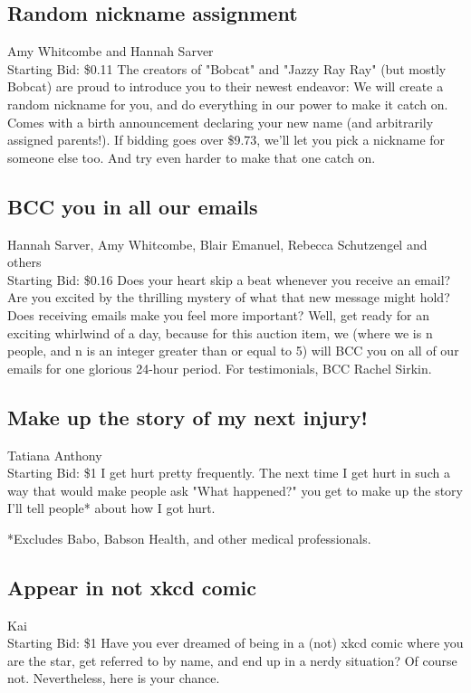 \documentclass[11pt]{article}
\begin{document}
\subsection{Random nickname assignment}
Amy Whitcombe and Hannah Sarver
\\
Starting Bid: \$0.11
\newline
The creators of "Bobcat" and "Jazzy Ray Ray" (but mostly Bobcat) are proud to introduce you to their newest endeavor: We will create a random nickname for you, and do everything in our power to make it catch on. Comes with a birth announcement declaring your new name (and arbitrarily assigned parents!). If bidding goes over \$9.73, we'll let you pick a nickname for someone else too. And try even harder to make that one catch on.
\subsection{BCC you in all our emails}
Hannah Sarver, Amy Whitcombe, Blair Emanuel, Rebecca Schutzengel and others
\\
Starting Bid: \$0.16
\newline
Does your heart skip a beat whenever you receive an email? Are you excited by the thrilling mystery of what that new message might hold? Does receiving emails make you feel more important? Well, get ready for an exciting whirlwind of a day, because for this auction item, we (where we is n people, and n is an integer greater than or equal to 5) will BCC you on all of our emails for one glorious 24-hour period. For testimonials, BCC Rachel Sirkin.
\subsection{Make up the story of my next injury!}
Tatiana Anthony
\\
Starting Bid: \$1
\newline
I get hurt pretty frequently.  The next time I get hurt in such a way that would make people ask "What happened?" you get to make up the story I'll tell people* about how I got hurt.


*Excludes Babo, Babson Health, and other medical professionals.
\subsection{Appear in not xkcd comic}
Kai
\\
Starting Bid: \$1
\newline
Have you ever dreamed of being in a (not) xkcd comic where you are the star, get referred to by name, and end up in a nerdy situation? Of course not. Nevertheless, here is your chance.
\end{document}
